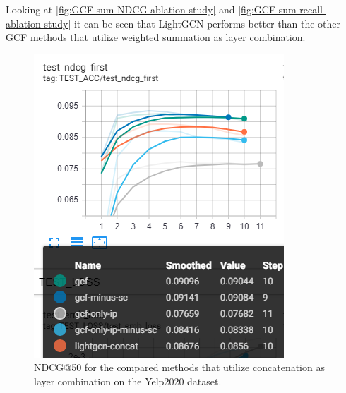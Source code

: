 Looking at \autoref{fig:GCF-sum-NDCG-ablation-study} and \autoref{fig:GCF-sum-recall-ablation-study} it can be seen that LightGCN performs better than the other GCF methods that utilize weighted summation as layer combination.
\begin{figure}[h!]
    \includegraphics[width=\linewidth]{figures/gcf-ndcg-concat.png}
    \caption{NDCG@50 for the compared methods that utilize concatenation as layer combination on the Yelp2020 dataset.}
    \label{fig:GCF-NDCG-concat-ablation-study}
\end{figure}
